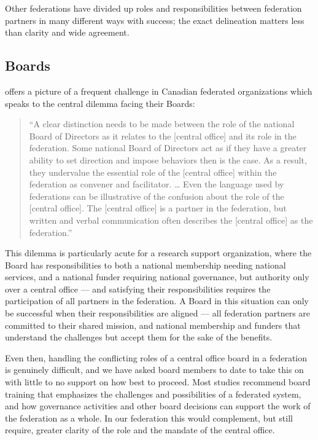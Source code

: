 \documentclass[11pt, letterpaper, twoside]{article}
\begin{document}
Other federations have divided up roles and responsibilities between
federation partners in many different ways with success; the exact
delineation matters less than clarity and wide agreement.

\subsection*{Boards}
%


\cite{mollenhauer_framework} offers a picture of a frequent challenge in Canadian
federated organizations which speaks to the central dilemma facing their
Boards:

\begin{quote}
``A clear distinction needs to be made between the role of the national
Board of Directors as it relates to the {[}central office{]} and its
role in the federation. Some national Board of Directors act as if they
have a greater ability to set direction and impose behaviors then is the
case. As a result, they undervalue the essential role of the {[}central
office{]} within the federation as convener and facilitator. \ldots{}
Even the language used by federations can be illustrative of the
confusion about the role of the {[}central office{]}. The {[}central
office{]} is a partner in the federation, but written and verbal
communication often describes the {[}central office{]} as the
federation.''
\end{quote}

This dilemma is particularly acute for a research support organization,
where the Board has responsibilities to both a national membership
needing national services, and a national funder requiring national
governance, but authority only over a central office --- and satisfying
their responsibilities requires the participation of all partners in the
federation. A Board in this situation can only be successful when their
responsibilities are aligned --- all federation partners are committed
to their shared mission, and national membership and funders that
understand the challenges but accept them for the sake of the benefits.

Even then, handling the conflicting roles of a central office board in a
federation is genuinely difficult, and we have asked board members to
date to take this on with little to no support on how best to proceed.
Most studies recommend board training that emphasizes the challenges and
possibilities of a federated system, and how governance activities and
other board decisions can support the work of the federation as a whole.
In our federation this would complement, but still require, greater
clarity of the role and the mandate of the central office.
\end{document}
